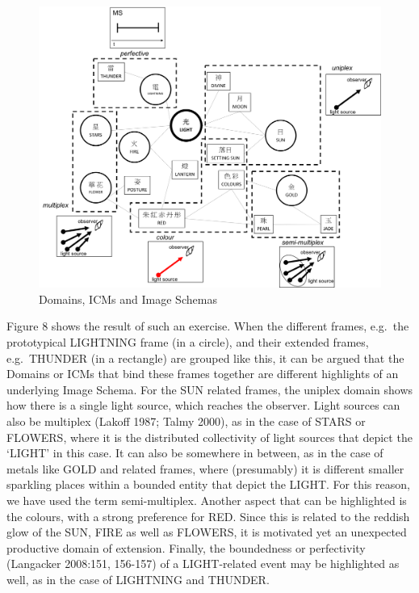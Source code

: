 \documentclass[12pt,article,oneside]{memoir}
\theoremstyle{definition}
\theoremstyle{definition}
\theoremstyle{definition}
\theoremstyle{remark}
\begin{document}
\begin{figure}
\includegraphics[width=27.64in]{ideos/domain2} \caption{Domains, ICMs and Image Schemas}\label{fig:domains}
\end{figure}

Figure 8 shows the result of such an exercise. When the different
frames, e.g.~the prototypical LIGHTNING frame (in a circle), and their
extended frames, e.g.~THUNDER (in a rectangle) are grouped like this, it
can be argued that the Domains or ICMs that bind these frames together
are different highlights of an underlying Image Schema. For the SUN
related frames, the uniplex domain shows how there is a single light
source, which reaches the observer. Light sources can also be multiplex
(Lakoff 1987; Talmy 2000), as in the case of STARS or FLOWERS, where it
is the distributed collectivity of light sources that depict the `LIGHT'
in this case. It can also be somewhere in between, as in the case of
metals like GOLD and related frames, where (presumably) it is different
smaller sparkling places within a bounded entity that depict the LIGHT.
For this reason, we have used the term semi-multiplex. Another aspect
that can be highlighted is the colours, with a strong preference for
RED. Since this is related to the reddish glow of the SUN, FIRE as well
as FLOWERS, it is motivated yet an unexpected productive domain of
extension. Finally, the boundedness or perfectivity (Langacker 2008:151,
156-157) of a LIGHT-related event may be highlighted as well, as in the
case of LIGHTNING and THUNDER.
\end{document}
